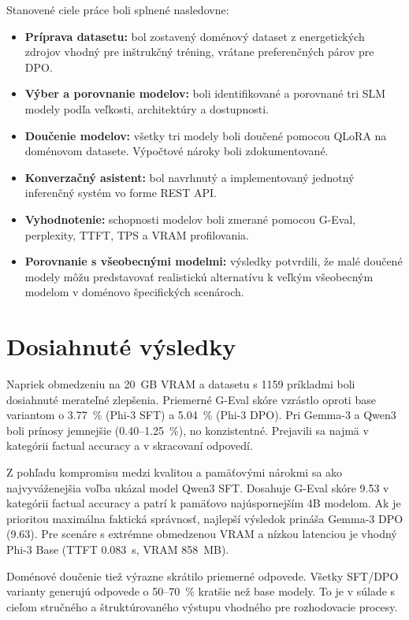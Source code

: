 Stanovené ciele práce boli splnené nasledovne:
 
\begin{itemize}
    \item \textbf{Príprava datasetu:} bol zostavený doménový dataset z energetických zdrojov vhodný pre inštrukčný tréning, vrátane preferenčných párov pre DPO.
    \item \textbf{Výber a porovnanie modelov:} boli identifikované a porovnané tri SLM modely podľa veľkosti, architektúry a dostupnosti.
    \item \textbf{Doučenie modelov:} všetky tri modely boli doučené pomocou QLoRA na doménovom datasete. Výpočtové nároky boli zdokumentované.
    \item \textbf{Konverzačný asistent:} bol navrhnutý a implementovaný jednotný inferenčný systém vo forme REST API.
    \item \textbf{Vyhodnotenie:} schopnosti modelov boli zmerané pomocou G-Eval, perplexity, TTFT, TPS a VRAM profilovania.
    \item \textbf{Porovnanie s všeobecnými modelmi:} výsledky potvrdili, že malé doučené modely môžu predstavovať realistickú alternatívu k veľkým všeobecným modelom v doménovo špecifických scenároch.
\end{itemize}
 
\section*{Dosiahnuté výsledky}
 
Napriek obmedzeniu na 20~GB VRAM a datasetu s 1159 príkladmi boli dosiahnuté merateľné zlepšenia. Priemerné G-Eval skóre vzrástlo oproti base variantom o 3.77~\% (Phi-3 SFT) a 5.04~\% (Phi-3 DPO). Pri Gemma-3 a Qwen3 boli prínosy jemnejšie (0.40--1.25~\%), no konzistentné. Prejavili sa najmä v kategórii factual accuracy a v skracovaní odpovedí.
 
Z pohľadu kompromisu medzi kvalitou a pamäťovými nárokmi sa ako najvyváženejšia voľba ukázal model Qwen3 SFT. Dosahuje G-Eval skóre 9.53 v kategórii factual accuracy a patrí k pamäťovo najúspornejším 4B modelom. Ak je prioritou maximálna faktická správnosť, najlepší výsledok prináša Gemma-3 DPO (9.63). Pre scenáre s extrémne obmedzenou VRAM a nízkou latenciou je vhodný Phi-3 Base (TTFT 0.083~s, VRAM 858~MB).
 
Doménové doučenie tiež výrazne skrátilo priemerné odpovede. Všetky SFT/DPO varianty generujú odpovede o 50--70~\% kratšie než base modely. To je v súlade s cieľom stručného a štruktúrovaného výstupu vhodného pre rozhodovacie procesy.
 
